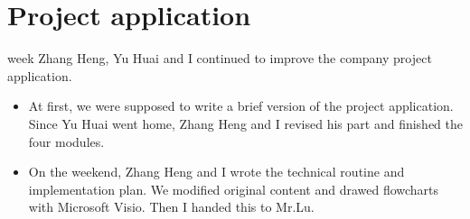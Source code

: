 \documentclass[]{IEEEtran}
\begin{document}
\section{Project application}
 week Zhang Heng, Yu Huai and I continued to improve the company project application. 
\begin{itemize}
	\item At first, we were supposed to write a brief version of the project application. Since Yu Huai went home, Zhang Heng and I revised his part and finished the four modules.
	\item On the weekend, Zhang Heng and I wrote the technical routine and implementation plan. We modified original content and drawed flowcharts with Microsoft Visio. Then I handed this to Mr.Lu.
	
\end{itemize}




\newpage
\end{document}
